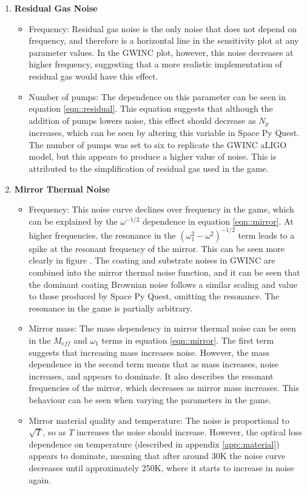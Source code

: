 \documentclass{article}
\begin{document}
\begin{enumerate}
    \item \textbf{Residual Gas Noise} \begin{itemize}
    \item Frequency: Residual gas noise is the only noise that does
      not depend on frequency, and therefore is a horizontal line in
      the sensitivity plot at any parameter values. In the GWINC plot,
      however, this noise decreases at higher frequency, suggesting
      that a more realistic implementation of residual gas would have
      this effect. 
    \item Number of pumps: The dependence on this parameter can be
      seen in equation \ref{eqn::residual}. This equation suggests
      that although the addition of pumps lowers noise, this effect
      should decrease as $N_p$ increases, which can be seen by
      altering this variable in Space Py Quest. The number of pumps
      was set to six to replicate the GWINC aLIGO model, but this
      appears to produce a higher value of noise. This is attributed
      to the simplification of residual gas used in the game.  
   \end{itemize}
    
    \item \textbf{Mirror Thermal Noise}
    \begin{itemize}
    \item Frequency: This noise curve declines over frequency in the
      game, which can be explained by the $\omega^{-1/2}$ dependence
      in equation \ref{eqn::mirror}. At higher frequencies, the
      resonance in the $(\omega_1^2-\omega^2)^{-1/2}$ term leads to a
      spike at the resonant frequency of the mirror. This can be seen
      more clearly in figure \label{fig::SPQMaxNoLim}. The coating and
      substrate noises in GWINC are combined into the mirror thermal
      noise function, and it can be seen that the dominant coating
      Brownian noise follows a similar scaling and value to those
      produced by Space Py Quest, omitting the resonance. The
      resonance in the game is partially arbitrary. 
    \item Mirror mass: The mass dependency in mirror thermal noise can
      be seen in the $M_{eff}$ and $\omega_1$ terms in equation
      \ref{eqn::mirror}. The first term suggests that increasing mass
      increases noise. However, the mass dependence in the second term
      means that as mass increases, noise increases, and appears to
      dominate. It also describes the resonant frequencies of the
      mirror, which decreases as mirror mass increases. This behaviour
      can be seen when varying the parameters in the game.
    \item Mirror material quality and temperature: The noise is
      proportional to $\sqrt{T}$, so as $T$ increases the noise should
      increase. However, the optical loss dependence on temperature
      (described in appendix \ref{app::material}) appears to dominate,
      meaning that after around 30K the noise curve decreases until
      approximately 250K, where it starts to increase in noise again. 
	\end{itemize}
    

\end{enumerate}
\end{document}
